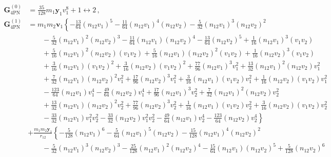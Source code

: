 \documentclass[prd,preprint,superscriptaddress,tightenlines,nofootinbib,
  eqsecnum,showpacs]{revtex4}
\begin{document}
\begin{subequations}\label{G4PN}
\begin{align}
\bm{G}^{(0)}_\text{4PN} &= \frac{35}{128} m_{1} \bm{y}_1 v_1^{8} 
+ 1 \leftrightarrow 2\,,\\
\bm{G}^{(1)}_\text{4PN} &= m_{1} m_{2} \bm{v}_1 \left\{- \frac{13}{64} (n_{12} v_1)^5
 -  \frac{11}{64} (n_{12} v_1)^4 (n_{12} v_2)
 -  \frac{5}{32} (n_{12} v_1)^3 (n_{12} v_2)^2 \right. \nonumber\\
& \qquad -  \frac{5}{32} (n_{12} v_1)^2 (n_{12} v_2)^3
 -  \frac{11}{64} (n_{12} v_1) (n_{12} v_2)^4
 -  \frac{13}{64} (n_{12} v_2)^5
 + \frac{1}{16} (n_{12} v_1)^3 (v_1 v_2)\nonumber\\
& \qquad + \frac{5}{16} (n_{12} v_1)^2 (n_{12} v_2) (v_1 v_2)
 + \frac{5}{16} (n_{12} v_1) (n_{12} v_2)^2 (v_1 v_2)
 + \frac{1}{16} (n_{12} v_2)^3 (v_1 v_2)\nonumber\\
& \qquad + \frac{3}{16} (n_{12} v_1) (v_1 v_2)^2
 + \frac{3}{16} (n_{12} v_2) (v_1 v_2)^2
 + \frac{77}{96} (n_{12} v_1)^3 v_1^{2}
 + \frac{13}{32} (n_{12} v_1)^2 (n_{12} v_2) v_1^{2}\nonumber\\
& \qquad + \frac{7}{32} (n_{12} v_1) (n_{12} v_2)^2 v_1^{2}
 + \frac{17}{96} (n_{12} v_2)^3 v_1^{2}
 + \frac{3}{16} (n_{12} v_1) (v_1 v_2) v_1^{2}
 + \frac{1}{16} (n_{12} v_2) (v_1 v_2) v_1^{2}\nonumber\\
& \qquad -  \frac{123}{64} (n_{12} v_1) v_1^{4}
 -  \frac{49}{64} (n_{12} v_2) v_1^{4}
 + \frac{17}{96} (n_{12} v_1)^3 v_2^{2}
 + \frac{7}{32} (n_{12} v_1)^2 (n_{12} v_2) v_2^{2}\nonumber\\
& \qquad + \frac{13}{32} (n_{12} v_1) (n_{12} v_2)^2 v_2^{2}
 + \frac{77}{96} (n_{12} v_2)^3 v_2^{2}
 + \frac{1}{16} (n_{12} v_1) (v_1 v_2) v_2^{2}
 + \frac{3}{16} (n_{12} v_2) (v_1 v_2) v_2^{2}\nonumber\\
&\left. \qquad -  \frac{33}{32} (n_{12} v_1) v_1^{2} v_2^{2}
 -  \frac{33}{32} (n_{12} v_2) v_1^{2} v_2^{2}
 -  \frac{49}{64} (n_{12} v_1) v_2^{4}
 -  \frac{123}{64} (n_{12} v_2) v_2^{4}\right\}\nonumber\\
& + \frac{m_{1} m_{2} \bm{y}_1}{r_{12}} \left\{- \frac{5}{128} (n_{12} v_1)^6
 -  \frac{5}{64} (n_{12} v_1)^5 (n_{12} v_2)
 -  \frac{15}{128} (n_{12} v_1)^4 (n_{12} v_2)^2 \right.\nonumber\\
& \qquad -  \frac{5}{32} (n_{12} v_1)^3 (n_{12} v_2)^3
 -  \frac{25}{128} (n_{12} v_1)^2 (n_{12} v_2)^4
 -  \frac{15}{64} (n_{12} v_1) (n_{12} v_2)^5
 + \frac{5}{128} (n_{12} v_2)^6\nonumber\\

\end{align}
\end{subequations}
\end{document}

